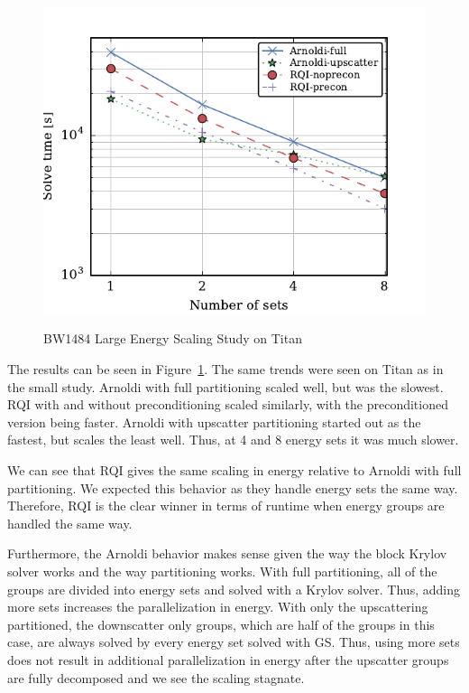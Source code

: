 \documentclass{article}                                                                           %
\begin{document}
\begin{figure}
\caption{BW1484  Large Energy Scaling Study on Titan}
\includegraphics[scale=1]{./bw1484-large-titan-timing.pdf}
\label{fig:titan}
\centering
\end{figure}
%
The results can be seen in Figure~\ref{fig:titan}. The same trends were seen on Titan as in the small study. Arnoldi with full partitioning scaled well, but was the slowest. RQI with and without preconditioning scaled similarly, with the preconditioned version being faster. Arnoldi with upscatter partitioning started out as the fastest, but scales the least well. Thus, at 4 and 8 energy sets it was much slower. 

We can see that RQI gives the same scaling in energy relative to Arnoldi with full partitioning. We expected this behavior as they handle energy sets the same way. Therefore, RQI is the clear winner in terms of runtime when energy groups are handled the same way. 

Furthermore, the Arnoldi behavior makes sense given the way the block Krylov solver works and the way partitioning works. With full partitioning, all of the groups are divided into energy sets and solved with a Krylov solver. Thus, adding more sets increases the parallelization in energy. With only the upscattering partitioned, the downscatter only groups, which are half of the groups in this case, are always solved by every energy set solved with GS. Thus, using more sets does not result in additional parallelization in energy after the upscatter groups are fully decomposed and we see the scaling stagnate. 
\end{document}
